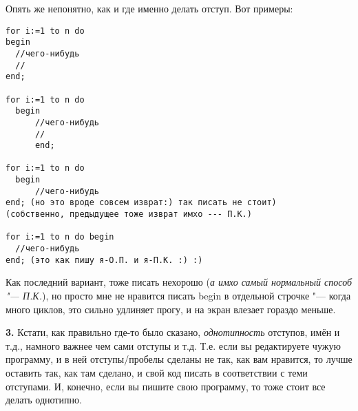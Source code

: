   Опять же непонятно, как и где именно делать отступ. Вот примеры:
  
\begin{codesample}\begin{verbatim}
for i:=1 to n do 
begin
  //чего-нибудь
  //
end;

for i:=1 to n do 
  begin
      //чего-нибудь
      //
      end;

for i:=1 to n do 
  begin
      //чего-нибудь
end; (но это вроде совсем изврат:) так писать не стоит)
(собственно, предыдущее тоже изврат имхо --- П.К.)

for i:=1 to n do begin
  //чего-нибудь
end; (это как пишу я-О.П. и я-П.К. :) :)
\end{verbatim}
\end{codesample}

Как последний вариант, тоже писать нехорошо (\textsl{а имхо самый нормальный способ "--- П.К.}), но просто мне 
не нравится писать begin в отдельной строчке "--- когда много циклов, это сильно удлиняет прогу, и 
на экран влезает гораздо меньше.

\textbf{3.} Кстати, как правильно где-то было сказано, \textit{однотипность} отступов, имён и т.д., намного важнее чем сами отступы и т.д. Т.е. если вы редактируете чужую программу, и в ней отступы/пробелы сделаны не так, как вам нравится, то лучше оставить так, как там сделано, и свой код писать в соответствии с теми отступами. И, конечно, если вы пишите свою программу, то тоже стоит все делать однотипно.